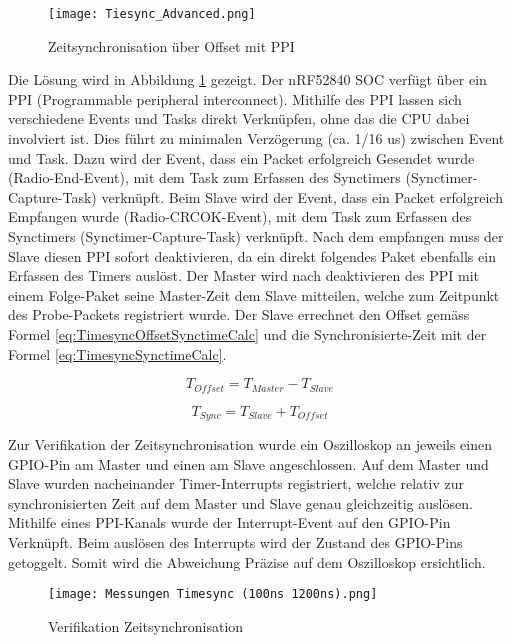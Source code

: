 \begin{figure} [H]
	\centering
	\texttt{[image: Tiesync\_Advanced.png]}
	\caption{Zeitsynchronisation über Offset mit PPI}
	\label{fig:TimesyncwithPPIP2P}
\end{figure}

Die Lösung wird in Abbildung \ref{fig:TimesyncwithPPIP2P} gezeigt. Der nRF52840 SOC verfügt über ein PPI (Programmable peripheral interconnect). Mithilfe des PPI lassen sich verschiedene Events und Tasks direkt Verknüpfen, ohne das die CPU dabei involviert ist. Dies führt zu minimalen Verzögerung (ca. 1/16 us) zwischen Event und Task. Dazu wird der Event, dass ein Packet erfolgreich Gesendet wurde (Radio-End-Event), mit dem Task zum Erfassen des Synctimers (Synctimer-Capture-Task) verknüpft. Beim Slave wird der Event, dass ein Packet erfolgreich Empfangen wurde (Radio-CRCOK-Event), mit dem Task zum Erfassen des Synctimers (Synctimer-Capture-Task) verknüpft. Nach dem empfangen muss der Slave diesen PPI sofort deaktivieren, da ein direkt folgendes Paket ebenfalls ein Erfassen des Timers auslöst. Der Master wird nach deaktivieren des PPI mit einem Folge-Paket seine Master-Zeit dem Slave mitteilen, welche zum Zeitpunkt des Probe-Packets registriert wurde. Der Slave errechnet den Offset gemäss Formel \ref{eq:TimesyncOffsetSynctimeCalc} und die Synchronisierte-Zeit mit der Formel \ref{eq:TimesyncSynctimeCalc}. \cite{nordic_semi_nrf_infocenter_ppi_2020}

\begin{equation}\label{eq:TimesyncOffsetSynctimeCalc}
T_{Offset} =  T_{Master} - T_{Slave} 
\end{equation}

\begin{equation}\label{eq:TimesyncSynctimeCalc}
T_{Sync} =  T_{Slave} + T_{Offset} 
\end{equation}

Zur Verifikation der Zeitsynchronisation wurde ein Oszilloskop an jeweils einen GPIO-Pin am Master und einen am Slave angeschlossen. Auf dem Master und Slave wurden nacheinander Timer-Interrupts registriert, welche relativ zur synchronisierten Zeit auf dem Master und Slave genau gleichzeitig auslösen. Mithilfe eines PPI-Kanals wurde der Interrupt-Event auf den GPIO-Pin Verknüpft. Beim auslösen des Interrupts wird der Zustand des GPIO-Pins getoggelt. Somit wird die Abweichung Präzise auf dem Oszilloskop ersichtlich.

\begin{figure} [H]
	\centering
	\texttt{[image: Messungen Timesync (100ns 1200ns).png]}
	\caption{Verifikation Zeitsynchronisation}
	\label{fig:TimesyncVerifikationP2P}
\end{figure}

